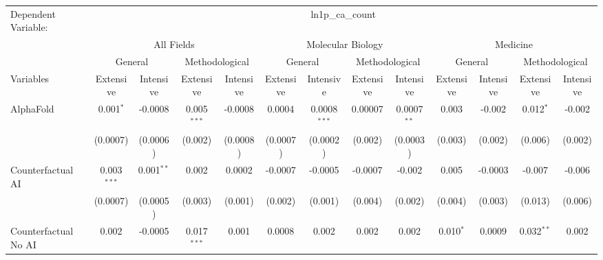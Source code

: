 \begingroup
\centering
\begin{tabular}{lcccccccccccc}
   \tabularnewline \midrule \midrule
   Dependent Variable: & \multicolumn{12}{c}{ln1p\_ca\_count}\\
 & \multicolumn{4}{c}{All Fields} & \multicolumn{4}{c}{Molecular Biology} & \multicolumn{4}{c}{Medicine} \\
\cmidrule(lr){2-5} \cmidrule(lr){6-9} \cmidrule(lr){10-13}
 & \multicolumn{2}{c}{General} & \multicolumn{2}{c}{Methodological} & \multicolumn{2}{c}{General} & \multicolumn{2}{c}{Methodological} & \multicolumn{2}{c}{General} & \multicolumn{2}{c}{Methodological} \\
\cmidrule(lr){2-3} \cmidrule(lr){4-5} \cmidrule(lr){6-7} \cmidrule(lr){8-9} \cmidrule(lr){10-11} \cmidrule(lr){12-13}
Variables & \multicolumn{1}{c}{Extensive} & \multicolumn{1}{c}{Intensive} & \multicolumn{1}{c}{Extensive} & \multicolumn{1}{c}{Intensive} & \multicolumn{1}{c}{Extensive} & \multicolumn{1}{c}{Intensive} & \multicolumn{1}{c}{Extensive} & \multicolumn{1}{c}{Intensive} & \multicolumn{1}{c}{Extensive} & \multicolumn{1}{c}{Intensive} & \multicolumn{1}{c}{Extensive} & \multicolumn{1}{c}{Intensive} \\
\cmidrule(lr){1-1}\cmidrule(lr){2-2} \cmidrule(lr){3-3} \cmidrule(lr){4-4} \cmidrule(lr){5-5} \cmidrule(lr){6-6} \cmidrule(lr){7-7} \cmidrule(lr){8-8} \cmidrule(lr){9-9} \cmidrule(lr){10-10} \cmidrule(lr){11-11} \cmidrule(lr){12-12} \cmidrule(lr){13-13}
   AlphaFold                                & 0.001$^{*}$   & -0.0008      & 0.005$^{***}$  & -0.0008        & 0.0004   & 0.0008$^{***}$ & 0.00007 & 0.0007$^{**}$ & 0.003        & -0.002   & 0.012$^{*}$   & -0.002\\   
                                            & (0.0007)      & (0.0006)     & (0.002)        & (0.0008)       & (0.0007) & (0.0002)       & (0.002) & (0.0003)      & (0.003)      & (0.002)  & (0.006)       & (0.002)\\   
   Counterfactual AI                        & 0.003$^{***}$ & 0.001$^{**}$ & 0.002          & 0.0002         & -0.0007  & -0.0005        & -0.0007 & -0.002        & 0.005        & -0.0003  & -0.007        & -0.006\\   
                                            & (0.0007)      & (0.0005)     & (0.003)        & (0.001)        & (0.002)  & (0.001)        & (0.004) & (0.002)       & (0.004)      & (0.003)  & (0.013)       & (0.006)\\   
   Counterfactual No AI                     & 0.002         & -0.0005      & 0.017$^{***}$  & 0.001          & 0.0008   & 0.002          & 0.002   & 0.002         & 0.010$^{*}$  & 0.0009   & 0.032$^{**}$  & 0.002\\   

\end{tabular}
